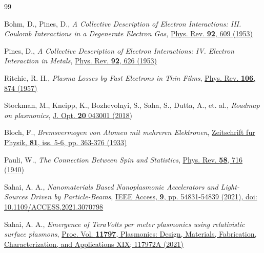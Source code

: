 \documentclass[aps,twocolumn,notitlepage,superscriptaddress]{revtex4-1}
\begin{document}
\begin{thebibliography}{99}

Bohm, D., Pines, D.,
	\textit{A Collective Description of Electron Interactions: III. Coulomb Interactions in a Degenerate Electron Gas},
	\href{https://doi.org/10.1103/PhysRev.92.609}{Phys. Rev. {\bf 92}, 609 (1953)}
	
Pines, D.,
	\textit{A Collective Description of Electron Interactions: IV. Electron Interaction in Metals},
	\href{https://doi.org/10.1103/PhysRev.92.626}{Phys. Rev. {\bf 92}, 626 (1953)}
	
Ritchie, R. H.,
	\textit{Plasma Losses by Fast Electrons in Thin Films},
	\href{https://doi.org/10.1103/PhysRev.106.874}{Phys. Rev. {\bf 106}, 874 (1957)}

Stockman, M., Kneipp, K., Bozhevolnyi, S., Saha, S., Dutta, A., et. al.,
	\textit{Roadmap on plasmonics},
	\href{https://doi.org/10.1088/2040-8986/aaa114}{J. Opt. {\bf 20} 043001 (2018)}
	
Bloch, F.,
	\textit{Bremsvermogen von Atomen mit mehreren Elektronen},
	\href{https://doi.org/10.1007/BF01344553}{Zeitschrift fur Physik, {\bf 81}, iss. 5-6, pp. 363-376 (1933)}
	
Pauli, W.,
	\textit{The Connection Between Spin and Statistics},
	\href{https://doi.org/10.1103/PhysRev.58.716}{Phys. Rev. {\bf 58}, 716 (1940)}

	
 Sahai, A. A., 
	\textit{Nanomaterials Based Nanoplasmonic Accelerators and Light-Sources Driven by Particle-Beams}, 
	\href{https://doi.org/10.1109/ACCESS.2021.3070798}{IEEE Access, {\bf 9}, pp. 54831-54839 (2021), doi: 10.1109/ACCESS.2021.3070798}
	
 Sahai, A. A., 
	\textit{Emergence of TeraVolts per meter plasmonics using relativistic surface plasmons},
	\href{https://doi.org/10.1117/12.2596637}{Proc. Vol. {\bf 11797}, Plasmonics: Design, Materials, Fabrication, Characterization, and Applications XIX; 117972A (2021)}


\end{thebibliography}
\end{document}
